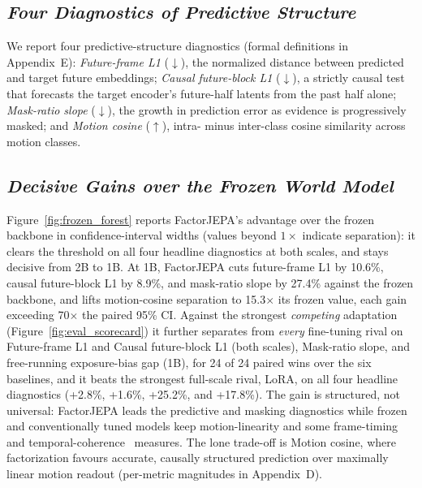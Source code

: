 \subsection{\textbf{\emph{Four Diagnostics of Predictive Structure}}}
We report four predictive-structure diagnostics (formal definitions in
Appendix~E): \emph{Future-frame L1} ($\downarrow$), the normalized distance
between predicted and target future embeddings; \emph{Causal future-block L1}
($\downarrow$), a strictly causal test that forecasts the target encoder's
future-half latents from the past half alone; \emph{Mask-ratio slope}
($\downarrow$), the growth in prediction error as evidence is progressively
masked; and \emph{Motion cosine} ($\uparrow$), intra- minus inter-class cosine
similarity across motion classes.



\subsection{\textbf{\emph{Decisive Gains over the Frozen World Model}}}

Figure~\ref{fig:frozen_forest} reports FactorJEPA's advantage over the frozen
backbone in confidence-interval widths (values beyond $1\times$ indicate
separation): it clears the threshold on all four headline diagnostics at both
scales, and stays decisive from 2B to 1B. At 1B, FactorJEPA cuts future-frame L1 by 10.6\%, causal future-block L1 by 8.9\%, and mask-ratio slope by 27.4\% against the frozen backbone, and lifts motion-cosine separation to 15.3$\times$ its frozen value, each gain exceeding 70$\times$ the paired 95\% CI. Against the strongest \emph{competing}
adaptation (Figure~\ref{fig:eval_scorecard}) it further separates from \emph{every}
fine-tuning rival on Future-frame L1 and Causal future-block L1 (both scales),
Mask-ratio slope, and free-running exposure-bias gap (1B), for 24 of 24 paired wins over the six baselines, and it beats the strongest full-scale rival, LoRA, on all four headline diagnostics (+2.8\%, +1.6\%, +25.2\%, and +17.8\%). The gain is structured,
not universal: FactorJEPA leads the predictive and masking diagnostics while
frozen and conventionally tuned models keep motion-linearity and some
frame-timing~\cite{misra2016shuffle, wang2020pace} and
temporal-coherence~\cite{wei2018aot, dwibedi2019tcc} measures. The lone
trade-off is Motion cosine, where factorization favours accurate, causally
structured prediction over maximally linear motion readout (per-metric
magnitudes in Appendix~D).

